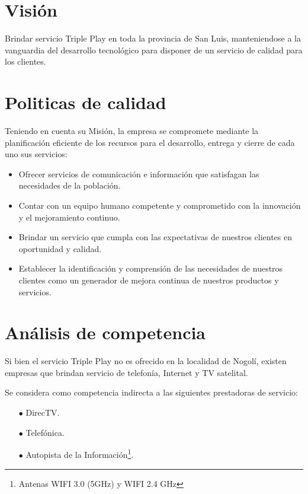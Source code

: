 \documentclass[12pt,a4paper]{book}
\begin{document}
\section{Visión}
Brindar servicio Triple Play en toda la provincia de San Luis, manteniendose a la vanguardia del desarrollo tecnológico para disponer de un servicio de calidad para los clientes.

\section{Politicas de calidad}
Teniendo en cuenta su Misión, la empresa se compromete mediante la planificación eficiente de los recursos para el desarrollo, entrega y cierre de cada uno sus servicios:

\begin{itemize}
\item Ofrecer servicios de comunicación e información que satisfagan las necesidades de la población.
\item Contar con un equipo humano competente y comprometido con la innovación y el mejoramiento continuo.
\item Brindar un servicio que cumpla con las expectativas de nuestros clientes en oportunidad y calidad.
\item Establecer la identificación y comprensión de las necesidades de nuestros clientes como un generador de mejora continua de nuestros productos y servicios.
\end{itemize}

\section{Análisis de competencia}\label{sec_analisis_competencia_Pnegocio}

\medskip 

Si bien el servicio Triple Play no es ofrecido en la localidad de Nogolí, existen empresas que brindan servicio de telefonía, Internet y TV satelital.

\medskip 

Se considera como competencia indirecta a las siguientes prestadoras de servicio:
\begin{itemize}
\item[$\bullet$] DirecTV.
\item[$\bullet$] Telefónica.
\item[$\bullet$] Autopista de la Información\footnote{Antenas WIFI 3.0 (5GHz) y WIFI 2.4 GHz}.
\end{itemize}
\end{document}
